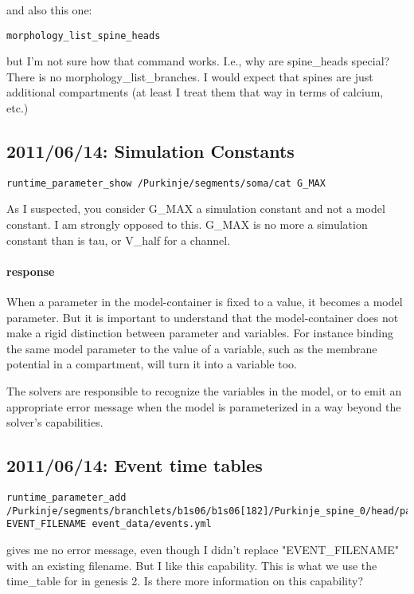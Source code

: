 \documentclass[12pt]{article}
\begin{document}
and also this one:
\begin{verbatim}
morphology_list_spine_heads
\end{verbatim}
but I'm not sure how that command works.  I.e., why are spine\_heads
special?  There is no morphology\_list\_branches.  I would expect that
spines are just additional compartments (at least I treat them that
way in terms of calcium, etc.)


\subsection{2011/06/14: Simulation Constants}

\begin{verbatim}
runtime_parameter_show /Purkinje/segments/soma/cat G_MAX
\end{verbatim}
As I suspected, you consider G\_MAX a simulation constant and not a
model constant.  I am strongly opposed to this.  G\_MAX is no more a
simulation constant than is tau, or V\_half for a channel.

\paragraph{response} When a parameter in the model-container is fixed
to a value, it becomes a model parameter.  But it is important to
understand that the model-container does not make a rigid distinction
between parameter and variables.  For instance binding the same model
parameter to the value of a variable, such as the membrane potential
in a compartment, will turn it into a variable too.

The solvers are responsible to recognize the variables in the model,
or to emit an appropriate error message when the model is
parameterized in a way beyond the solver's capabilities.


\subsection{2011/06/14: Event time tables}

\begin{verbatim}
runtime_parameter_add /Purkinje/segments/branchlets/b1s06/b1s06[182]/Purkinje_spine_0/head/par/synapse EVENT_FILENAME event_data/events.yml
\end{verbatim}

gives me no error message, even though I didn't replace
"EVENT\_FILENAME" with an existing filename.  But I like this
capability.  This is what we use the time\_table for in genesis 2.  Is
there more information on this capability?
\end{document}
